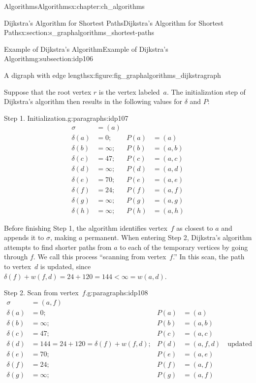 \documentclass[oneside,10pt,]{book}
\numberwithin{equation}{section}
\newcommand{\lt}{<}
\newcommand{\amp}{&}
\begin{document}
\begin{chapterptx}{Algorithms}{}{Algorithms}{}{}{x:chapter:ch_algorithms}
\begin{sectionptx}{Dijkstra's Algorithm for Shortest Paths}{}{Dijkstra's Algorithm for Shortest Paths}{}{}{x:section:s_graphalgorithms_shortest-paths}
\begin{subsectionptx}{Example of Dijkstra's Algorithm}{}{Example of Dijkstra's Algorithm}{}{}{g:subsection:idp106}
\begin{figureptx}{A digraph with edge lengths}{x:figure:fig_graphalgorithms_dijkstragraph}{}
\begin{image}{0.075}{0.85}{0.075}
\end{image}%
\tcblower
\end{figureptx}%
Suppose that the root vertex \(r\) is the vertex labeled~\(a\). The initialization step of Dijkstra's algorithm then results in the following values for \(\delta\) and \(P\):%
\begin{paragraphs}{Step 1. Initialization.}{g:paragraphs:idp107}%
%
\begin{align*}
\sigma\amp=(a)\amp\amp\\
\delta(a)\amp=0; \amp P(a)\amp=(a)\\
\delta(b) \amp=\infty; \amp P(b)\amp=(a,b)\\
\delta(c) \amp=47; \amp P(c)\amp=(a,c)\\
\delta(d) \amp=\infty; \amp P(d)\amp=(a,d)\\
\delta(e) \amp=70; \amp P(e)\amp=(a,e)\\
\delta(f) \amp=24; \amp P(f)\amp=(a,f)\\
\delta(g) \amp=\infty; \amp P(g)\amp=(a,g)\\
\delta(h) \amp=\infty; \amp P(h)\amp=(a,h)
\end{align*}
%
\par
Before finishing Step 1, the algorithm identifies vertex~\(f\) as closest to \(a\) and appends it to \(\sigma\), making \(a\) permanent. When entering Step 2, Dijkstra's algorithm attempts to find shorter paths from \(a\) to each of the temporary vertices by going through \(f\). We call this process ``scanning from vertex~\(f\).'' In this scan, the path to vertex~\(d\) is updated, since \(\delta(f) + w(f,d)=24+120=144\lt \infty=w(a,d)\).%
\end{paragraphs}%
\begin{paragraphs}{Step 2.  Scan from vertex~\(f\).}{g:paragraphs:idp108}%
%
\begin{align*}
\sigma\amp=(a,f)\amp\amp\\
\delta(a)\amp=0; \amp P(a)\amp=(a)\\
\delta(b)\amp=\infty; \amp P(b)\amp=(a,b)\\
\delta(c)\amp=47; \amp P(c)\amp=(a,c)\\
\delta(d)\amp=144 = 24 + 120 = \delta(f)+w(f,d); \amp P(d)\amp=(a,f,d)\quad\text{updated} \\
\delta(e)\amp=70; \amp P(e)\amp=(a,e)\\
\delta(f)\amp=24; \amp P(f)\amp=(a,f)\\
\delta(g)\amp=\infty; \amp P(g)\amp=(a,f)\\

\end{align*}
\end{paragraphs}
\end{subsectionptx}
\end{sectionptx}
\end{chapterptx}
\end{document}
